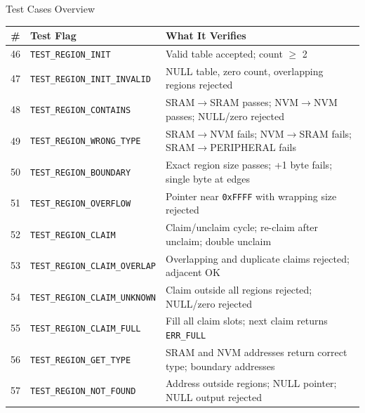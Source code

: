 \documentclass[aspectratio=169, 10pt]{beamer}
\begin{document}
\begin{frame}{Test Cases Overview}
\begin{table}
\centering
\small
\begin{tabular}{@{}clp{7cm}@{}}
\toprule
\textbf{\#} & \textbf{Test Flag} & \textbf{What It Verifies} \\
\midrule
46 & \texttt{TEST\_REGION\_INIT}          & Valid table accepted; count $\ge$ 2 \\
47 & \texttt{TEST\_REGION\_INIT\_INVALID} & NULL table, zero count, overlapping regions rejected \\
48 & \texttt{TEST\_REGION\_CONTAINS}      & SRAM$\to$SRAM passes; NVM$\to$NVM passes; NULL/zero rejected \\
49 & \texttt{TEST\_REGION\_WRONG\_TYPE}   & SRAM$\to$NVM fails; NVM$\to$SRAM fails; SRAM$\to$PERIPHERAL fails \\
50 & \texttt{TEST\_REGION\_BOUNDARY}      & Exact region size passes; +1 byte fails; single byte at edges \\
51 & \texttt{TEST\_REGION\_OVERFLOW}      & Pointer near \texttt{0xFFFF} with wrapping size rejected \\
52 & \texttt{TEST\_REGION\_CLAIM}         & Claim/unclaim cycle; re-claim after unclaim; double unclaim \\
53 & \texttt{TEST\_REGION\_CLAIM\_OVERLAP}& Overlapping and duplicate claims rejected; adjacent OK \\
54 & \texttt{TEST\_REGION\_CLAIM\_UNKNOWN}& Claim outside all regions rejected; NULL/zero rejected \\
55 & \texttt{TEST\_REGION\_CLAIM\_FULL}   & Fill all claim slots; next claim returns \texttt{ERR\_FULL} \\
56 & \texttt{TEST\_REGION\_GET\_TYPE}     & SRAM and NVM addresses return correct type; boundary addresses \\
57 & \texttt{TEST\_REGION\_NOT\_FOUND}    & Address outside regions; NULL pointer; NULL output rejected \\
\bottomrule
\end{tabular}
\end{table}
\end{frame}
\end{document}
